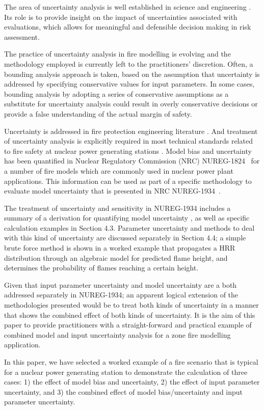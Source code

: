 
The area of uncertainty analysis is well established in science and engineering \cite{Morgan}.  Its role is to provide insight on the impact of uncertainties associated with evaluations, which allows for meaningful and defensible decision making in risk assessment.

The practice of uncertainty analysis in fire modelling is evolving and the methodology employed is currently left to the practitioners' discretion. Often, a bounding analysis approach is taken, based on the assumption that uncertainty is addressed by specifying conservative values for input parameters. In some cases, bounding analysis by adopting a series of conservative assumptions as a substitute for uncertainty analysis could result in overly conservative decisions or provide a false understanding of the actual margin of safety. 

Uncertainty is addressed in fire protection engineering literature \cite{Notarianni:SFPE}.  And treatment of uncertainty analysis is explicitly required in most technical standards related to fire safety at nuclear power generating stations \cite{NFPA:805, NUREG:6850}.  Model bias and uncertainty has been quantified in Nuclear Regulatory Commission (NRC) NUREG-1824~\cite{NUREG_1824} for a number of fire models which are commonly used in nuclear power plant applications. This information can be used as part of a specific methodology to evaluate model uncertainty  that is presented in NRC NUREG-1934~\cite{NUREG_1934}. 

The treatment of  uncertainty and sensitivity in NUREG-1934 includes a summary of a derivation for quantifying model uncertainty \cite{McGrattan2011a}, as well as specific calculation examples in Section 4.3. Parameter uncertainty and methods to deal with this kind of uncertainty are discussed separately in Section 4.4; a simple brute force method is shown in  a worked example that propagates a HRR distribution through an algebraic model for predicted flame height, and determines the probability of flames reaching a certain height.

Given that input parameter uncertainty and model uncertainty are a both addressed separately in NUREG-1934; an apparent logical extension of the methodologies presented would be to treat both kinds of uncertainty in a manner that shows the combined effect of both kinds of uncertainty.  It is the aim of this paper to provide practitioners with a straight-forward and practical example of combined model and input uncertainty analysis for a zone fire modelling application. 

In this paper, we have selected  a worked example of a fire scenario that is typical for a nuclear power generating station to demonstrate the calculation of three cases: 1) the effect of model bias and uncertainty, 2) the effect of input parameter uncertainty, and 3) the combined effect of model bias/uncertainty and input parameter uncertainty. 

